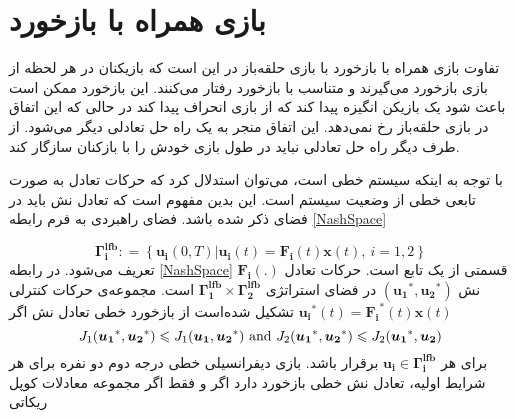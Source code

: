 \section{بازی همراه با بازخورد}
تفاوت بازی همراه با بازخورد با بازی حلقه‌باز در این است که بازیکنان در هر لحظه از بازی بازخورد می‌گیرند و متناسب با بازخورد رفتار می‌کنند. این بازخورد ممکن است باعث شود یک بازیکن انگیزه پیدا کند که از بازی انحراف پیدا کند در حالی که این اتفاق در بازی حلقه‌باز رخ نمی‌دهد. این اتفاق منجر به یک راه حل تعادلی دیگر می‌شود. از طرف دیگر راه حل تعادلی نباید در طول بازی خودش را با بازکنان سازگار کند.


با توجه به اینکه سیستم خطی است، می‌توان استدلال کرد که حرکات تعادل به صورت تابعی خطی از وضعیت سیستم است. این بدین مفهوم است که تعادل نش باید در فضای ذکر شده باشد. فضای راهبردی
 به فرم رابطه
 \ref{NashSpace}

\begin{equation}\label{NashSpace}
	\boldsymbol{\Gamma^{lfb}_i} :‌= \left\{\boldsymbol{u_i}(0, T)\vert \boldsymbol{u_i}(t) = \boldsymbol{F_i}(t)\boldsymbol{x}(t) ,~ i = 1, 2\right\}
\end{equation}
تعریف می‌شود. در رابطه
 \ref{NashSpace}
$\boldsymbol{F_i}(.)$
قسمتی از یک تابع است. حرکات تعادل نش
$(\boldsymbol{u_1}^*, \boldsymbol{u_2}^*)$
در فضای استراتژی 
$\boldsymbol{\Gamma^{lfb}_1}\times\boldsymbol{\Gamma^{lfb}_2}$
است.
مجموعه‌ی حرکات کنترلی 
$\boldsymbol{u_i}^*(t)=\boldsymbol{F_i}^*(t)\boldsymbol{x}(t)$
تشکیل شده‌است از بازخورد خطی تعادل نش اگر
\begin{equation*}
	J_1(\boldsymbol{u_1}^*, \boldsymbol{u_2}^*)\leq J_1(\boldsymbol{u_1}, \boldsymbol{u_2}^*)\text{\rm{ and }}
	J_2(\boldsymbol{u_1}^*,\boldsymbol{ u_2}^*)\leq J_2(\boldsymbol{u_1}^*, \boldsymbol{u_2})
\end{equation*}
برای هر 
$\boldsymbol{u_i}\in \boldsymbol{\Gamma^{lfb}_i}$
برقرار باشد.
بازی دیفرانسیلی خطی درجه دوم دو نفره برای هر شرایط اولیه، تعادل نش خطی بازخورد دارد اگر و فقط اگر مجموعه معادلات کوپل ریکاتی

